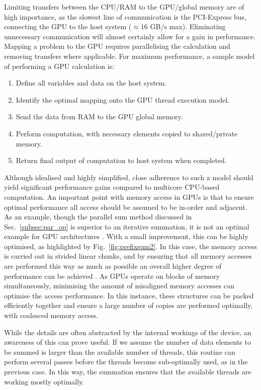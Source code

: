 Limiting transfers between the CPU/RAM to the GPU/global memory are of high importance, as the slowest line of communication is the PCI-Express bus, connecting the GPU to the host system ($\approx 16 $ GB/s max). Eliminating unnecessary communication will almost certainly allow for a gain in performance. Mapping a problem to the GPU requires parallelising the calculation and removing transfers where applicable. For maximum performance, a sample model of performing a GPU calculation is:
\begin{enumerate}
    \item Define all variables and data on the host system.
    \item Identify the optimal mapping onto the GPU thread execution model.
    \item Send the data from RAM to the GPU global memory.
    \item Perform computation, with necessary elements copied to shared/private memory.
    \item Return final output of computation to host system when completed.
\end{enumerate}

Although idealised and highly simplified, close adherence to such a model should yield significant performance gains compared to multicore CPU-based computation. An important point with memory access in GPUs is that to ensure optimal performance all access should be assumed to be in-order and adjacent. As an example, though the parallel sum method discussed in Sec.~\ref{subsec:par_op} is superior to an iterative summation, it is not an optimal example for GPU architectures \cite{BK:Cuda_book}. With a small improvement, this can be highly optimised, as highlighted by Fig.~\ref{fig:prefixsum2}. In this case, the memory access is carried out in strided linear chunks, and by ensuring that all memory accesses are performed this way as much as possible an overall higher degree of performance can be achieved \cite{BK:Cuda_book}. As GPUs operate on blocks of memory simultaneously, minimising the amount of misaligned memory accesses can optimise the access performance. In this instance, these structures can be packed efficiently together and ensure a large number of copies are performed optimally, with coalesced memory access.

While the details are often abstracted by the internal workings of the device, an awareness of this can prove useful. If we assume the number of data elements to be summed is larger than the available number of threads, this routine can perform several passes before the threads become sub-optimally used, as in the previous case. In this way, the summation ensures that the available threads are working mostly optimally.

